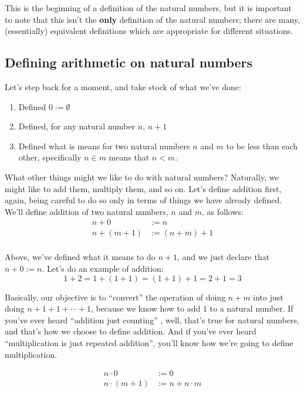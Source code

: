 This is the beginning of a definition of the natural numbers, but it is important to note that this isn't the \textbf{only} definition of the natural numbers; there are many, (essentially) equivalent definitions which are appropriate for different situations.

\subsection{Defining arithmetic on natural numbers}

Let's step back for a moment, and take stock of what we've done:

\begin{enumerate}
    \item Defined $0 := \emptyset$
    \item Defined, for any natural number $n$, $n + 1$
    \item Defined what is means for two natural numbers $n$ and $m$ to be less than each other, specifically $n \in m$ means that $n < m$.
\end{enumerate}

What other things might we like to do with natural numbers?
Naturally, we might like to add them, multiply them, and so on.
Let's define addition first, again, being careful to do so only in terms of things we have already defined.
We'll define addition of two natural numbers, $n$ and $m$, as follows:
\begin{align*}
    n + 0 &:= n \\
    n + (m + 1) &:= (n + m) + 1 \\
\end{align*}

Above, we've defined what it means to do $n + 1$, and we just declare that $n + 0 := n$.
Let's do an example of addition:
\[
    1 + 2 = 1 + (1 + 1) = (1 + 1) + 1 = 2 + 1 = 3
\]

Basically, our objective is to ``convert'' the operation of doing $n + m$ into just doing $n + 1 + 1 + \cdots + 1$, because we know how to add $1$ to a natural number.
If you've ever heard ``addition just counting'' , well, that's true for natural numbers, and that's how we choose to define addition.
And if you've ever heard ``multiplication is just repeated addition'', you'll know how we're going to define multiplication.

\begin{align*}
    n \cdot 0 &:= 0 \\
    n \cdot (m + 1) &:= n + n \cdot m
\end{align*}


